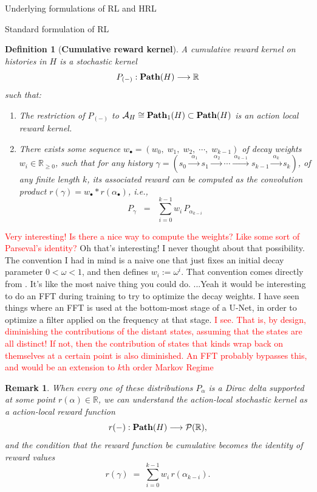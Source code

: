 \documentclass[11pt]{article}
\newtheorem{definition}[subsubsection]{Definition}
\newtheorem{remark}[subsubsection]{Remark}
\begin{document}
\begin{section}{Underlying formulations of RL and HRL}
\begin{subsection}{Standard formulation of RL}
\begin{definition}[{\bf Cumulative reward kernel}]
A {\em cumulative reward kernel} on histories in $H$ is a stochastic kernel
$$
P_{(-)}:\bold{Path}(H)\longrightarrow \mathbb{R}
$$
such that:
\begin{enumerate}
\item
The restriction of $P_{(-)}$ to $\mathcal{A}_{H}\cong\bold{Path}_{1}(H)\subset\bold{Path}(H)$ is an action local reward kernel.
\item
There exists some sequence $w_{\bullet}=(w_{0}, \;w_{1},\;w_{2},\;\cdots,\;w_{k-1})$ of {\em decay weights} $w_{i}\in\mathbb{R}_{\ge0}$, such that for any history $\gamma=(s_{0}\xrightarrow{\ \ \alpha_{1}\ }s_{1}\xrightarrow{\ \ \alpha_{2}\ }\cdots\xrightarrow{\ \alpha_{k-1}\ }s_{k-1}\xrightarrow{\ \alpha_{k}\ }s_{k})$, of any finite length $k$, its associated reward can be computed as the convolution product $r(\gamma)=w_{\bullet}\ast r(\alpha_{\bullet})$, i.e.,
$$
    P_{\gamma}\;\;=\;\;\sum_{i=0}^{k-1} w_{i}\,P_{\alpha_{k-i}}
$$
\end{enumerate}
\end{definition}
\textcolor{red}{Very interesting! Is there a nice way to compute the weights? Like some sort of Parseval's identity?} {\color{blue} Oh that's interesting! I never thought about that possibility. The convention I had in mind is a naive one that just fixes an initial decay parameter $0<\omega<1$, and then defines $w_{i}:=\omega^{i}$. That convention comes directly from \cite{SBRL}. It's like the most naive thing you could do. ...Yeah it would be interesting to do an FFT during training to try to optimize the decay weights. I have seen things where an FFT is used at the bottom-most stage of a U-Net, in order to optimize a filter applied on the frequency at that stage.} \textcolor{red}{I see. That is, by design, diminishing the contributions of the distant states, assuming that the states are all distinct! If not, then the contribution of states that kinds wrap back on themselves at a certain point is also diminished. An FFT probably bypasses this, and would be an extension to $k$th order Markov Regime}
\begin{remark}
\normalfont
When every one of these distributions $P_{\!\alpha}$ is a Dirac delta supported at some point $r(\alpha)\in\mathbb{R}$, we can understand the action-local stochastic kernel as a {\em action-local reward function}
$$
r(-):\bold{Path}(H)\longrightarrow\mathcal{P}(\mathbb{R}),
$$
and the condition that the reward function be cumulative becomes the identity of reward values
$$
    r(\gamma)\;=\;\sum_{i=0}^{k-1} w_{i}\,r(\alpha_{k-i}).
$$
\end{remark}


\end{subsection}
\end{section}
\end{document}

